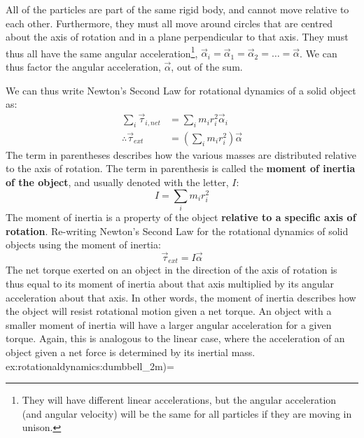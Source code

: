 All of the particles are part of the same rigid body, and cannot move relative to each other. Furthermore, they must all move around circles that are centred about the axis of rotation and in a plane perpendicular to that axis. They must thus all have the same angular acceleration\footnote{They will have different linear accelerations, but the angular acceleration (and angular velocity) will be the same for all particles if they are moving in unison.}, $\vec\alpha_i = \vec \alpha_1 = \vec \alpha_2 =\dots=\vec\alpha$. We can thus factor the angular acceleration, $\vec \alpha$, out of the sum.

We can thus write Newton's Second Law for rotational dynamics of a solid object as:
\begin{align*}
\sum_i \vec\tau_{i,net} &= \sum_i  m_ir_i^2\vec\alpha_i\\
\therefore \vec\tau_{ext}&= \left(\sum_i  m_ir_i^2\right)\vec\alpha
\end{align*}
The term in parentheses describes how the various masses are distributed relative to the axis of rotation. The term in parenthesis is called the \textbf{moment of inertia of the object}, and usually denoted with the letter, $I$:
\begin{equation}
\boxed{I = \sum_i  m_ir_i^2}
\end{equation}
The moment of inertia is a property of the object \textbf{relative to a specific axis of rotation}. Re-writing Newton's Second Law for the rotational dynamics of solid objects using the moment of inertia:
\begin{equation}
\boxed{\vec\tau_{ext} = I\vec\alpha}
\end{equation}
The net torque exerted on an object in the direction of the axis of rotation is thus equal to its moment of inertia about that axis multiplied by its angular acceleration about that axis. In other words, the moment of inertia describes how the object will resist rotational motion given a net torque. An object with a smaller moment of inertia will have a larger angular acceleration for a given torque. Again, this is analogous to the linear case, where the acceleration of an object given a net force is determined by its inertial mass.
ex:rotationaldynamics:dumbbell\_2m)=

